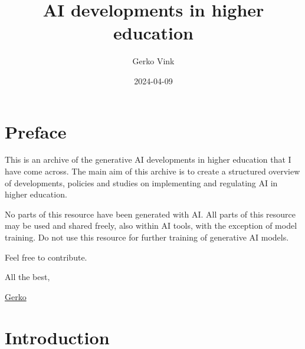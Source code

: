 \documentclass[
  letterpaper,
  DIV=11,
  numbers=noendperiod]{scrreprt}
\title{AI developments in higher education}
\author{Gerko Vink}
\date{2024-04-09}
\renewcommand*\contentsname{Table of contents}
\newcommand\contentsname{Table of contents}
\begin{document}
\maketitle

\renewcommand*\contentsname{Table of contents}
{
\hypersetup{linkcolor=}
\setcounter{tocdepth}{2}
\tableofcontents
}

\chapter*{Preface}\label{preface}


This is an archive of the generative AI developments in higher education
that I have come across. The main aim of this archive is to create a
structured overview of developments, policies and studies on
implementing and regulating AI in higher education.

No parts of this resource have been generated with AI. All parts of this
resource may be used and shared freely, also within AI tools, with the
exception of model training. Do not use this resource for further
training of generative AI models.

Feel free to contribute.

All the best,

\href{https://www.gerkovink.com}{Gerko}




\chapter{Introduction}\label{introduction}
\end{document}
